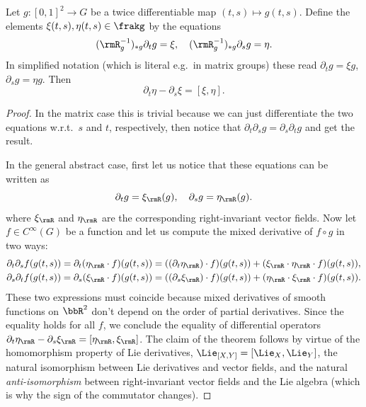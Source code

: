 \begin{prop}\label{prop MC eq xi eta}
    Let $g:[0,1]^2\to G$ be a twice differentiable map $(t,s)\mapsto g(t,s)$. Define the elements $\xi(t,s),\eta(t,s)\in\frakg$ by the equations
    \[(\rmR_{g}^{-1})_{\ast g}\partial_t g=\xi, \quad (\rmR_{g}^{-1})_{\ast g}\partial_s g=\eta.\]
    In simplified notation (which is literal e.g.~in matrix groups) these read $\partial_t g=\xi g$, $\partial_s g=\eta g$. Then 
    \[\partial_t \eta-\partial_s \xi =[\xi,\eta].\label{eq Maurer-Cartan}\]
\end{prop}
\begin{proof}
    In the matrix case this is trivial because we can just differentiate the two equations w.r.t.\ $s$ and $t$, respectively, then notice that $\partial_t\partial_s g=\partial_s\partial_t g$ and get the result.

    In the general abstract case, first let us notice that these equations can be written as
    \[\partial_t g=\xi_\rmR(g),\quad \partial_s g=\eta_\rmR(g).\]
    where $\xi_\rmR$ and $\eta_\rmR$ are the corresponding right-invariant vector fields. Now let $f\in C^\infty(G)$ be a function and let us compute the mixed derivative of $f\circ g$ in two ways:
    \begin{gather}
        \partial_t\partial_s f(g(t,s))=\partial_t (\eta_\rmR\cdot f)(g(t,s))=((\partial_t\eta_\rmR)\cdot f)(g(t,s))+(\xi_\rmR\cdot \eta_\rmR\cdot f)(g(t,s)),\\
        \partial_s\partial_t f(g(t,s))=\partial_s (\xi_\rmR\cdot f)(g(t,s))=((\partial_s\xi_\rmR)\cdot f)(g(t,s))+(\eta_\rmR\cdot \xi_\rmR\cdot f)(g(t,s)).
    \end{gather}
    These two expressions must coincide because mixed derivatives of smooth functions on $\bbR^2$ don't depend on the order of partial derivatives. Since the equality holds for all $f$, we conclude the equality of differential operators $\partial_t\eta_\rmR-\partial_s\xi_\rmR=[\eta_\rmR,\xi_\rmR]$. The claim of the theorem follows by virtue of the homomorphism property of Lie derivatives, $\Lie_{[X,Y]}=[\Lie_X,\Lie_Y]$, the natural isomorphism between Lie derivatives and vector fields, and the natural \emph{anti-isomorphism} between right-invariant vector fields and the Lie algebra (which is why the sign of the commutator changes).
\end{proof}

